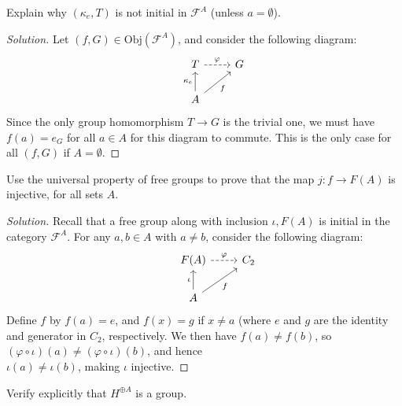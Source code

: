 \documentclass[12pt]{article}
\newenvironment{problem}[2][Problem]{\begin{trivlist}
\item[\hskip \labelsep {\bfseries #1}\hskip \labelsep {\bfseries #2.}]}{\end{trivlist}}
\newcommand{\Obj}{\text{Obj}}
\newenvironment{solution}
  {\renewcommand\qedsymbol{$\blacksquare$}\begin{proof}[Solution]}
{\end{proof}}
\begin{document}
\begin{problem}{5.2}
  Explain why $(\kappa_e,T)$ is not initial in $\mathcal{F}^A$ (unless $a=\emptyset$).
\end{problem}
\begin{solution}
  Let $(f, G)\in \Obj(\mathscr{F}^A)$, and consider the following diagram: 
   \[\begin{tikzcd}
       & T\ar[dashed]{r}{\varphi} & G \\
    & A \ar{u}{\kappa_e} \ar{ur}[swap]{f}
    \end{tikzcd}\]
    Since the only group homomorphism $T\to G$ is the trivial one, we must have 
    $f(a) = e_G$ for all $a\in A$ for this diagram to commute.
    This is the only case for all $(f,G)$ if $A=\emptyset$.
\end{solution}
\begin{problem}{5.3}
  Use the universal property of free groups to prove that the map $j : f \to F(A)$ is injective,
  for all sets $A$.
\end{problem}
\begin{solution}
  Recall that a free group along with inclusion $\iota, F(A)$ is initial in the category $\mathscr{F}^A$.
  For any $a,b\in A$ with $a\neq b$, consider the following diagram:
   \[\begin{tikzcd}
       & F(A)\ar[dashed]{r}{\varphi} & C_2 \\
       & A \ar{u}{\iota} \ar{ur}[swap]{f}
    \end{tikzcd}\]
    Define $f$ by $f(a) = e$, and $f(x) = g$ if $x\neq a$ 
    (where $e$ and $g$ are the identity and generator in $C_2$, respectively.
      We then have $f(a)\neq f(b)$, so $(\varphi\circ\iota)(a) \neq (\varphi\circ\iota)(b)$,
      and hence \\$\iota(a)\neq\iota(b)$, making $\iota$ injective.
\end{solution}
\begin{problem}{5.5}
  Verify explicitly that $H^{\oplus A}$ is a group.
\end{problem}
\end{document}
